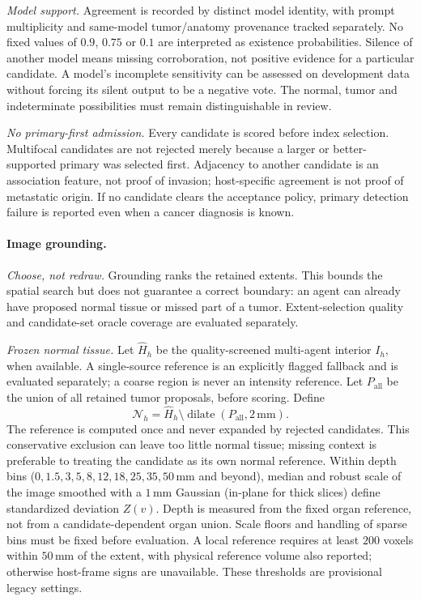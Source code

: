 \documentclass[fleqn,10pt]{olplainarticle}
\begin{document}
\emph{Model support.} Agreement is recorded by distinct model identity, with prompt multiplicity and same-model
tumor/anatomy provenance tracked separately. No fixed values of $0.9$, $0.75$ or $0.1$ are interpreted as existence
probabilities. Silence of another model means missing corroboration, not positive evidence for a particular candidate.
A model's incomplete sensitivity can be assessed on development data without forcing its silent output to be a negative
vote. The normal, tumor and indeterminate possibilities must remain distinguishable in review.

\emph{No primary-first admission.} Every candidate is scored before index selection. Multifocal candidates are not rejected
merely because a larger or better-supported primary was selected first. Adjacency to another candidate is an association
feature, not proof of invasion; host-specific agreement is not proof of metastatic origin. If no candidate clears the
acceptance policy, primary detection failure is reported even when a cancer diagnosis is known.

\paragraph{Image grounding.}
\label{sec:grounding_details}
\emph{Choose, not redraw.} Grounding ranks the retained extents. This bounds the spatial search but does not guarantee a
correct boundary: an agent can already have proposed normal tissue or missed part of a tumor. Extent-selection quality and
candidate-set oracle coverage are evaluated separately.

\emph{Frozen normal tissue.} Let $\hat H_h$ be the quality-screened multi-agent interior $I_h$, when available. A
single-source reference is an explicitly flagged fallback and is evaluated separately; a coarse region is never an
intensity reference. Let $P_{\mathrm{all}}$ be the union of all retained tumor proposals, before scoring. Define
\begin{equation}
\mathcal{N}_h=\hat H_h\setminus\operatorname{dilate}(P_{\mathrm{all}},2\,\mathrm{mm}).
\end{equation}
The reference is computed once and never expanded by rejected candidates. This conservative exclusion can leave too
little normal tissue; missing context is preferable to treating the candidate as its own normal reference. Within depth
bins ($0,1.5,3,5,8,12,18,25,35,50$\,mm and beyond), median and robust scale of the image smoothed with a $1$\,mm Gaussian
(in-plane for thick slices) define standardized deviation $Z(v)$. Depth is measured from the fixed organ reference, not
from a candidate-dependent organ union. Scale floors and handling of sparse bins must be fixed before evaluation.
A local reference requires at least $200$ voxels within $50$\,mm of the extent, with physical reference volume also reported;
otherwise host-frame signs are unavailable. These thresholds are provisional legacy settings.
\end{document}
